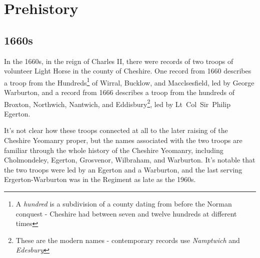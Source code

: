 \chapter{Prehistory}

\section*{1660s}

In the 1660s, in the reign of Charles II, there were records of two troops of volunteer Light Horse in the county of Cheshire. One record from 1660 describes a troop from the Hundreds\footnote{A \emph{hundred} is a subdivision of a county dating from before the Norman conquest - Cheshire had between seven and twelve hundreds at different times} of Wirral, Bucklow, and Macclsesfield, led by George Warburton, and a record from 1666 describes a troop from the hundreds of Broxton, Northwich, Nantwich, and Eddisbury\footnote{These are the modern names - contemporary records use \textit{Namptwich} and \textit{Edesbury}}, led by Lt~Col~Sir~Philip Egerton.

It's not clear how these troops connected at all to the later raising of the Cheshire Yeomanry proper, but the names associated with the two troops are familiar through the whole history of the Cheshire Yeomanry, including Cholmondeley, Egerton, Grosvenor, Wilbraham, and Warburton. It's notable that the two troops were led by an Egerton and a Warburton, and the last serving Ergerton-Warburton was in the Regiment as late as the 1960s.
